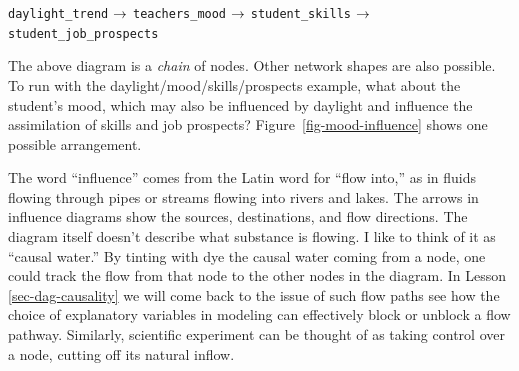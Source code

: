 \documentclass[
  letterpaper,
  DIV=11,
  numbers=noendperiod,
  oneside]{scrartcl}
\begin{document}
\texttt{daylight\_trend} \(\Large\rightarrow\) \texttt{teachers\_mood}
\(\Large\rightarrow\) \texttt{student\_skills} \(\Large\rightarrow\)
\texttt{student\_job\_prospects}

The above diagram is a \emph{chain} of nodes. Other network shapes are
also possible. To run with the daylight/mood/skills/prospects example,
what about the student's mood, which may also be influenced by daylight
and influence the assimilation of skills and job prospects?
Figure~\ref{fig-mood-influence} shows one possible arrangement.

{
\makeatletter
\def\LT@makecaption#1#2#3{%
  \noalign{\smash{\hbox{\kern\textwidth\rlap{\kern\marginparsep
  \parbox[t]{\marginparwidth}{%
    \footnotesize{%
      \vspace{(1.1\baselineskip)}
    #1{#2: }\ignorespaces #3}}}}}}%
    }
\makeatother

\begin{figure}



\end{figure}%

}

The word ``influence'' comes from the Latin word for ``flow into,'' as
in fluids flowing through pipes or streams flowing into rivers and
lakes. The arrows in influence diagrams show the sources, destinations,
and flow directions. The diagram itself doesn't describe what substance
is flowing. I like to think of it as ``causal water.'' By tinting with
dye the causal water coming from a node, one could track the flow from
that node to the other nodes in the diagram. In Lesson
\ref{sec-dag-causality} we will come back to the issue of such flow
paths see how the choice of explanatory variables in modeling can
effectively block or unblock a flow pathway. Similarly, scientific
experiment can be thought of as taking control over a node, cutting off
its natural inflow.
\end{document}
